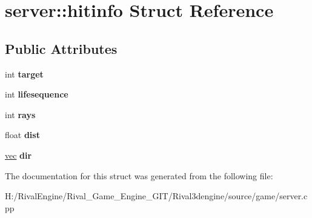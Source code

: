\hypertarget{structserver_1_1hitinfo}{}\section{server\+:\+:hitinfo Struct Reference}
\label{structserver_1_1hitinfo}
\subsection*{Public Attributes}
\begin{DoxyCompactItemize}
\item 
\mbox{\label{structserver_1_1hitinfo_ae0b2bba1aa9cb4ec3bb47cc8a7e1d1c4}} 
int {\bfseries target}
\item 
\mbox{\label{structserver_1_1hitinfo_abd4e9eb1ea0f47f7c3f0f526c70fed72}} 
int {\bfseries lifesequence}
\item 
\mbox{\label{structserver_1_1hitinfo_a65885ed25f26fff3286fc350a24a0cc6}} 
int {\bfseries rays}
\item 
\mbox{\label{structserver_1_1hitinfo_a08df7d270caa963abc92dd648f8b3017}} 
float {\bfseries dist}
\item 
\mbox{\label{structserver_1_1hitinfo_acf74f83c8efebb6e9f7d95e932287206}} 
\hyperlink{structvec}{vec} {\bfseries dir}
\end{DoxyCompactItemize}


The documentation for this struct was generated from the following file\+:\begin{DoxyCompactItemize}
\item 
H\+:/\+Rival\+Engine/\+Rival\+\_\+\+Game\+\_\+\+Engine\+\_\+\+G\+I\+T/\+Rival3dengine/source/game/server.\+cpp\end{DoxyCompactItemize}
